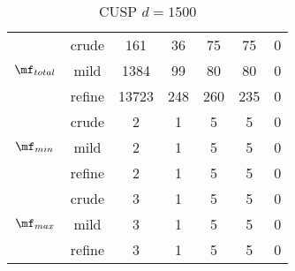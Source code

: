 \begin{table}[htb]
\begin{tabular}{ |c|c|c|c|c|c|c| }
\hline
  & crude & 161 & 36 & 75 & 75 & 0 \\
 $\mf_{total}$  & mild & 1384 & 99 & 80 & 80 & 0 \\
  & refine & 13723 & 248 & 260 & 235 & 0 \\
\hline
  & crude & 2 & 1 & 5 & 5 & 0 \\
 $\mf_{min}$  & mild & 2 & 1 & 5 & 5 & 0 \\
  & refine & 2 & 1 & 5 & 5 & 0 \\
\hline
  & crude & 3 & 1 & 5 & 5 & 0 \\
 $\mf_{max}$  & mild & 3 & 1 & 5 & 5 & 0 \\
  & refine & 3 & 1 & 5 & 5 & 0 \\
\hline
\end{tabular}
\caption{ CUSP $d=1500$ }
\end{table}
